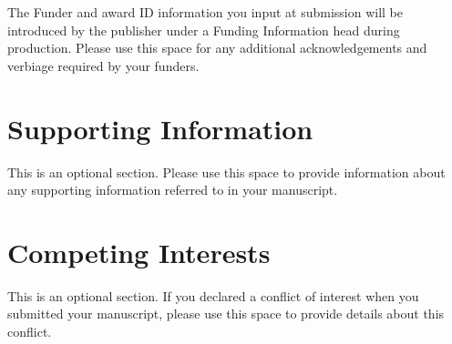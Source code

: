 \documentclass[NETN,manuscript]{stjour-new}
\begin{document}







% 

\acknowledgments
The Funder and award ID information you input at submission will be introduced by the publisher under a Funding Information head during production. 
Please use this space for any additional acknowledgements and verbiage required by your funders.

\section{Supporting Information}
This is an optional section. Please use this space to provide information about any supporting information referred to in your manuscript.

\section{Competing Interests}
This is an optional section. If you declared a conflict of interest when you submitted your manuscript, please  use this space to provide details about this conflict.
\end{document}

